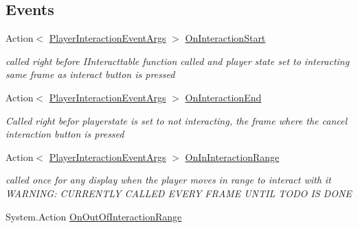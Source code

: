 \subsection*{Events}
\begin{DoxyCompactItemize}
\item 
Action$<$ \mbox{\hyperlink{class_player_interaction_event_args}{Player\+Interaction\+Event\+Args}} $>$ \mbox{\hyperlink{class_player_a22eae36e514445cac4172890ed186638}{On\+Interaction\+Start}}
\begin{DoxyCompactList}\small\item\em called right before I\+Interacttable function called and player state set to interacting same frame as interact button is pressed \end{DoxyCompactList}\item 
Action$<$ \mbox{\hyperlink{class_player_interaction_event_args}{Player\+Interaction\+Event\+Args}} $>$ \mbox{\hyperlink{class_player_a08a7813ef2273b80058d734256218cff}{On\+Interaction\+End}}
\begin{DoxyCompactList}\small\item\em Called right befor playerstate is set to not interacting, the frame where the cancel interaction button is pressed \end{DoxyCompactList}\item 
Action$<$ \mbox{\hyperlink{class_player_interaction_event_args}{Player\+Interaction\+Event\+Args}} $>$ \mbox{\hyperlink{class_player_a6da2c61e5e06e970835852ed3d65157c}{On\+In\+Interaction\+Range}}
\begin{DoxyCompactList}\small\item\em called once for any display when the player moves in range to interact with it W\+A\+R\+N\+I\+NG\+: C\+U\+R\+R\+E\+N\+T\+LY C\+A\+L\+L\+ED E\+V\+E\+RY F\+R\+A\+ME U\+N\+T\+IL T\+O\+DO IS D\+O\+NE \end{DoxyCompactList}\item 
System.\+Action \mbox{\hyperlink{class_player_a319e807c138700dc247ebbba9579899e}{On\+Out\+Of\+Interaction\+Range}}
\end{DoxyCompactItemize}
